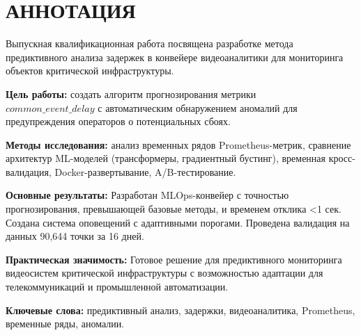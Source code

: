 \chapter*{АННОТАЦИЯ}

\hspace*{1.25cm}Выпускная квалификационная работа посвящена разработке метода предиктивного анализа задержек в конвейере видеоаналитики для мониторинга объектов критической инфраструктуры.

\hspace*{1.25cm}\textbf{Цель работы:} создать алгоритм прогнозирования метрики \\ $common\_event\_delay$ с автоматическим обнаружением аномалий для предупреждения операторов о потенциальных сбоях.

\hspace*{1.25cm}\textbf{Методы исследования:} анализ временных рядов Prometheus-метрик, сравнение архитектур ML-моделей (трансформеры, градиентный бустинг), временная кросс-валидация, Docker-развертывание, A/B-тестирование.

\hspace*{1.25cm}\textbf{Основные результаты:} Разработан MLOps-конвейер с точностью прогнозирования, превышающей базовые методы, и временем отклика <1 сек. Создана система оповещений с адаптивными порогами. Проведена валидация на данных 90,644 точки за 16 дней.

\hspace*{1.25cm}\textbf{Практическая значимость:} Готовое решение для предиктивного мониторинга видеосистем критической инфраструктуры с возможностью адаптации для телекоммуникаций и промышленной автоматизации.

\vspace*{1cm}
\hspace*{1.25cm}\textbf{Ключевые слова:} предиктивный анализ, задержки, видеоаналитика, Prometheus, временные ряды, аномалии.

\newpage 